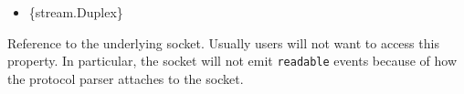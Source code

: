 \begin{itemize}
\tightlist
\item
  \{stream.Duplex\}
\end{itemize}

Reference to the underlying socket. Usually users will not want to
access this property. In particular, the socket will not emit
\texttt{\textquotesingle{}readable\textquotesingle{}} events because of
how the protocol parser attaches to the socket.

\begin{Shaded}
\begin{Highlighting}[]
 \OperatorTok{;}
\OperatorTok{=}\NormalTok{ \{}
  \OperatorTok{:} \OperatorTok{,}
\NormalTok{\}}\OperatorTok{;}
\OperatorTok{=}\OperatorTok{;}
\NormalTok{()}\OperatorTok{;}
\NormalTok{(}\OperatorTok{,}\KeywordTok{=\textgreater{}}\NormalTok{ \{}
  \OperatorTok{=}\OperatorTok{;}
  \OperatorTok{=}\OperatorTok{;}
  \NormalTok{(}\SpecialCharTok{$\{}\SpecialCharTok{\}}\SpecialCharTok{$\{}\SpecialCharTok{\}}\NormalTok{)}\OperatorTok{;}
\NormalTok{\})}\OperatorTok{;}
\end{Highlighting}
\end{Shaded}

